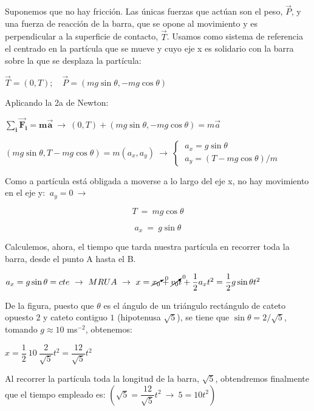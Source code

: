 \vspace{0.5cm}
Suponemos que no hay fricción. Las únicas fuerzas que actúan son el peso, $\overrightarrow P$, y una fuerza de reacción de la barra, que se opone al movimiento y es perpendicular a la superficie de contacto, $\overrightarrow T$. Usamos como sistema de referencia el centrado en la partícula que se mueve y cuyo eje x es solidario con la barra sobre la que se desplaza la partícula:

$\overrightarrow T=(0,T);\quad \overrightarrow P=(mg\sin \theta, -mg \cos \theta)$

Aplicando la 2a de Newton:

$\displaystyle \boldsymbol{ \sum_i  \overrightarrow F_i =m\overrightarrow a } \ \to \ (0,T)+(mg\sin \theta, -mg \cos \theta)=m\overrightarrow a$

$(mg\sin \theta, T-mg \cos \theta)=m(a_x,a_y) \ \to \ \begin{cases}
 \ a_x=g\sin \theta	 \\ \ a_y=(T-mg \cos \theta) / m
 \end{cases}$

Como a partícula está obligada a moverse a lo largo del eje x, no hay movimiento en el eje y: $\ a_y = 0 \ \to \ $

\begin{multicols}{2}
\begin{equation}
T \ = \ mg\cos \theta	
\end{equation}

\begin{equation}
a_x \ = \ g \sin \theta	
\end{equation}
\end{multicols}

Calculemos, ahora, el tiempo que tarda nuestra partícula en recorrer toda la barra, desde el punto A hasta el B.

$a_x=g\sin \theta = cte \ \to \ MRUA \ \to \ x=\cancelto{0}{x_0}+ \cancelto{0}{v_0}t+\dfrac 1 2 a_x t^2=\dfrac 1 2 g \sin \theta t^2$

De la figura, puesto que $\theta$ es el ángulo de un triángulo rectángulo de cateto opuesto $2$ y cateto contiguo $1$ (hipotenusa $\sqrt{5}$), se tiene que $\sin \theta = 2/\sqrt{5}$, tomando $g\approx 10$ ms$^{-2}$, obtenemos:

$x=\dfrac 1 2 \ 10 \ \dfrac 2 {\sqrt{5}} t^2 = \dfrac {12}{\sqrt
5} t^2$

Al recorrer la partícula toda la longitud de la barra, $\sqrt
5$, obtendremos finalmente que el tiempo empleado es: \textcolor{gris}{$\left( \sqrt{5}=\dfrac {12}{\sqrt
5} t^2 \ \to \ 5=10 t^2 \right)$}

